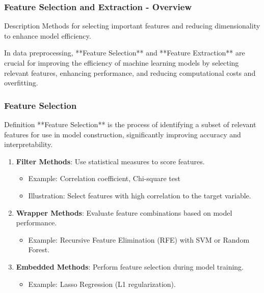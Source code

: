 \documentclass[aspectratio=169]{beamer}
\begin{document}
\begin{frame}[fragile]
    \frametitle{Feature Selection and Extraction - Overview}
    \begin{block}{Description}
        Methods for selecting important features and reducing dimensionality to enhance model efficiency.
    \end{block}
    In data preprocessing, **Feature Selection** and **Feature Extraction** are crucial for improving the efficiency of machine learning models by selecting relevant features, enhancing performance, and reducing computational costs and overfitting.
\end{frame}

\begin{frame}[fragile]
    \frametitle{Feature Selection}
    \begin{block}{Definition}
        **Feature Selection** is the process of identifying a subset of relevant features for use in model construction, significantly improving accuracy and interpretability.
    \end{block}
    
    \begin{enumerate}
        \item \textbf{Filter Methods}: Use statistical measures to score features.
            \begin{itemize}
                \item Example: Correlation coefficient, Chi-square test
                \item Illustration: Select features with high correlation to the target variable.
            \end{itemize}
        
        \item \textbf{Wrapper Methods}: Evaluate feature combinations based on model performance.
            \begin{itemize}
                \item Example: Recursive Feature Elimination (RFE) with SVM or Random Forest.
            \end{itemize}
        
        \item \textbf{Embedded Methods}: Perform feature selection during model training.
            \begin{itemize}
                \item Example: Lasso Regression (L1 regularization).
            \end{itemize}
    \end{enumerate}
\end{frame}
\end{document}

